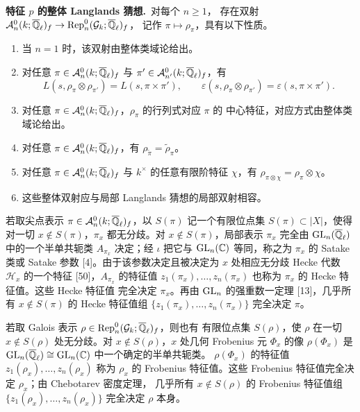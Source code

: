 \par\medskip\noindent\textbf{特征 $p$ 的整体 Langlands 猜想.}\ 对每个 $n\ge1$，
存在双射 $\mathcal{A}_n^0(k;\overline{\mathbb{Q}}_\ell)_f\to\operatorname{Rep}_n^0(\mathcal{G}_k;\overline{\mathbb{Q}}_\ell)_f$，
记作 $\pi\mapsto\rho_\pi$，具有以下性质。
\begin{enumerate}[label=(\roman*),leftmargin=*]
  \item 当 $n=1$ 时，该双射由整体类域论给出。
  \item 对任意 $\pi\in\mathcal{A}_n^0(k;\overline{\mathbb{Q}}_\ell)_f$ 与
    $\pi'\in\mathcal{A}_{n'}^0(k;\overline{\mathbb{Q}}_\ell)_f$，有
    \[
      L(s,\rho_\pi\otimes\rho_{\pi'})=L(s,\pi\times\pi'),\qquad
      \varepsilon(s,\rho_\pi\otimes\rho_{\pi'})=\varepsilon(s,\pi\times\pi').
    \]
  \item 对任意 $\pi\in\mathcal{A}_n^0(k;\overline{\mathbb{Q}}_\ell)_f$，$\rho_\pi$ 的行列式对应 $\pi$ 的
    中心特征，对应方式由整体类域论给出。
  \item 对任意 $\pi\in\mathcal{A}_n^0(k;\overline{\mathbb{Q}}_\ell)_f$，有
    $\rho_{\tilde\pi}=\tilde\rho_\pi$。
  \item 对任意 $\pi\in\mathcal{A}_n^0(k;\overline{\mathbb{Q}}_\ell)_f$ 与 $k^\times$ 的任意有限阶特征
    $\chi$，有 $\rho_{\pi\otimes\chi}=\rho_\pi\otimes\chi$。
  \item 这些整体双射应与局部 Langlands 猜想的局部双射相容。
\end{enumerate}
\par\medskip

若取尖点表示 $\pi\in\mathcal{A}_n^0(k;\overline{\mathbb{Q}}_\ell)_f$，以 $S(\pi)$ 记一个有限位点集
$S(\pi)\subset|X|$，使得对一切 $x\notin S(\pi)$，$\pi_x$ 都无分歧。对
$x\notin S(\pi)$，局部表示 $\pi_x$ 完全由 $\mathrm{GL}_n(\overline{\mathbb{Q}}_\ell)$ 中的一个半单共轭类
$A_{\pi_x}$ 决定；经 $\iota$ 把它与 $\mathrm{GL}_n(\mathbb{C})$ 等同，称之为 $\pi_x$ 的
Satake 类或 Satake 参数 [4]。由于该参数决定且被决定为 $x$ 处相应无分歧 Hecke 代数
$\mathcal{H}_x$ 的一个特征 [50]，$A_{\pi_x}$ 的特征值
$z_1(\pi_x),\dots,z_n(\pi_x)$ 也称为 $\pi_x$ 的 Hecke 特征值。这些 Hecke 特征值
完全决定 $\pi_x$。再由 $\mathrm{GL}_n$ 的强重数一定理 [13]，几乎所有
$x\notin S(\pi)$ 的 Hecke 特征值组
$\{z_1(\pi_x),\dots,z_n(\pi_x)\}$ 完全决定 $\pi$。

若取 Galois 表示 $\rho\in\operatorname{Rep}_n^0(\mathcal{G}_k;\overline{\mathbb{Q}}_\ell)_f$，则也有
有限位点集 $S(\rho)$，使 $\rho$ 在一切 $x\notin S(\rho)$ 处无分歧。对
$x\notin S(\rho)$，$x$ 处几何 Frobenius 元 $\Phi_x$ 的像
$\rho(\Phi_x)$ 是 $\mathrm{GL}_n(\overline{\mathbb{Q}}_\ell)\cong\mathrm{GL}_n(\mathbb{C})$ 中一个确定的半单共轭类。
$\rho(\Phi_x)$ 的特征值 $z_1(\rho_x),\dots,z_n(\rho_x)$ 称为 $\rho_x$ 的
Frobenius 特征值。这些 Frobenius 特征值完全决定 $\rho_x$；由 Chebotarev 密度定理，
几乎所有 $x\notin S(\rho)$ 的 Frobenius 特征值组
$\{z_1(\rho_x),\dots,z_n(\rho_x)\}$ 完全决定 $\rho$ 本身。


